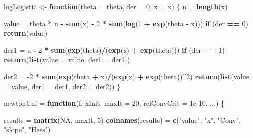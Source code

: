 \documentclass[12pt,]{article}
\newenvironment{Shaded}{\begin{snugshade}}{\end{snugshade}}
\newcommand{\ControlFlowTok}[1]{\textcolor[rgb]{0.13,0.29,0.53}{\textbf{#1}}}
\newcommand{\DataTypeTok}[1]{\textcolor[rgb]{0.13,0.29,0.53}{#1}}
\newcommand{\DecValTok}[1]{\textcolor[rgb]{0.00,0.00,0.81}{#1}}
\newcommand{\FloatTok}[1]{\textcolor[rgb]{0.00,0.00,0.81}{#1}}
\newcommand{\KeywordTok}[1]{\textcolor[rgb]{0.13,0.29,0.53}{\textbf{#1}}}
\newcommand{\NormalTok}[1]{#1}
\newcommand{\OperatorTok}[1]{\textcolor[rgb]{0.81,0.36,0.00}{\textbf{#1}}}
\newcommand{\OtherTok}[1]{\textcolor[rgb]{0.56,0.35,0.01}{#1}}
\newcommand{\StringTok}[1]{\textcolor[rgb]{0.31,0.60,0.02}{#1}}
\begin{document}
\begin{Shaded}
\begin{Highlighting}[]
\NormalTok{logLogistic <-}\StringTok{ }\ControlFlowTok{function}\NormalTok{(}\DataTypeTok{theta =}\NormalTok{ theta, }\DataTypeTok{der =} \DecValTok{0}\NormalTok{, }\DataTypeTok{x =}\NormalTok{ x) \{}
\NormalTok{    n =}\StringTok{ }\KeywordTok{length}\NormalTok{(x)}
    
\NormalTok{    value =}\StringTok{ }\NormalTok{theta }\OperatorTok{*}\StringTok{ }\NormalTok{n }\OperatorTok{-}\StringTok{ }\KeywordTok{sum}\NormalTok{(x) }\OperatorTok{-}\StringTok{ }\DecValTok{2} \OperatorTok{*}\StringTok{ }\KeywordTok{sum}\NormalTok{(}\KeywordTok{log}\NormalTok{(}\DecValTok{1} \OperatorTok{+}\StringTok{ }\KeywordTok{exp}\NormalTok{(theta }\OperatorTok{-}\StringTok{ }
\StringTok{        }\NormalTok{x)))}
    \ControlFlowTok{if}\NormalTok{ (der }\OperatorTok{==}\StringTok{ }\DecValTok{0}\NormalTok{) }
        \KeywordTok{return}\NormalTok{(value)}
    
\NormalTok{    der1 =}\StringTok{ }\NormalTok{n }\OperatorTok{-}\StringTok{ }\DecValTok{2} \OperatorTok{*}\StringTok{ }\KeywordTok{sum}\NormalTok{(}\KeywordTok{exp}\NormalTok{(theta)}\OperatorTok{/}\NormalTok{(}\KeywordTok{exp}\NormalTok{(x) }\OperatorTok{+}\StringTok{ }\KeywordTok{exp}\NormalTok{(theta)))}
    \ControlFlowTok{if}\NormalTok{ (der }\OperatorTok{==}\StringTok{ }\DecValTok{1}\NormalTok{) }
        \KeywordTok{return}\NormalTok{(}\KeywordTok{list}\NormalTok{(}\DataTypeTok{value =}\NormalTok{ value, }\DataTypeTok{der1 =}\NormalTok{ der1))}
    
\NormalTok{    der2 =}\StringTok{ }\DecValTok{-2} \OperatorTok{*}\StringTok{ }\KeywordTok{sum}\NormalTok{(}\KeywordTok{exp}\NormalTok{(theta }\OperatorTok{+}\StringTok{ }\NormalTok{x)}\OperatorTok{/}\NormalTok{(}\KeywordTok{exp}\NormalTok{(x) }\OperatorTok{+}\StringTok{ }\KeywordTok{exp}\NormalTok{(theta))}\OperatorTok{^}\DecValTok{2}\NormalTok{)}
    \KeywordTok{return}\NormalTok{(}\KeywordTok{list}\NormalTok{(}\DataTypeTok{value =}\NormalTok{ value, }\DataTypeTok{der1 =}\NormalTok{ der1, }\DataTypeTok{der2 =}\NormalTok{ der2))}
\NormalTok{\}}

\NormalTok{newtonUni =}\StringTok{ }\ControlFlowTok{function}\NormalTok{(f, xInit, }\DataTypeTok{maxIt =} \DecValTok{20}\NormalTok{, }\DataTypeTok{relConvCrit =} \FloatTok{1e-10}\NormalTok{, }
\NormalTok{    ...) \{}
    
\NormalTok{    results =}\StringTok{ }\KeywordTok{matrix}\NormalTok{(}\OtherTok{NA}\NormalTok{, maxIt, }\DecValTok{5}\NormalTok{)}
    \KeywordTok{colnames}\NormalTok{(results) =}\StringTok{ }\KeywordTok{c}\NormalTok{(}\StringTok{"value"}\NormalTok{, }\StringTok{"x"}\NormalTok{, }\StringTok{"Conv"}\NormalTok{, }\StringTok{"slope"}\NormalTok{, }
        \StringTok{"Hess"}\NormalTok{)}
    

\end{Highlighting}
\end{Shaded}
\end{document}
